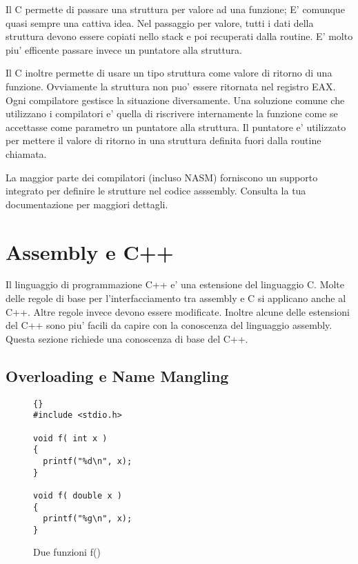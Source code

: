 Il C permette di passare una struttura per valore ad una funzione; E' comunque
quasi sempre una cattiva idea. Nel passaggio per valore, tutti i dati della
struttura devono essere copiati nello stack e poi recuperati dalla routine. E'
molto piu' efficente passare invece un puntatore alla struttura.

Il C inoltre permette di usare un tipo struttura come valore di ritorno di una
funzione. Ovviamente la struttura non puo' essere ritornata nel registro {\code EAX}.
Ogni compilatore gestisce la situazione diversamente. Una soluzione comune
che utilizzano i compilatori e' quella di riscrivere internamente la funzione
come se accettasse come parametro un puntatore alla struttura. Il puntatore
e' utilizzato per mettere il valore di ritorno in una struttura definita fuori
dalla routine chiamata.

La maggior parte dei compilatori (incluso NASM) forniscono un supporto integrato
per definire le strutture nel codice asssembly. Consulta la tua documentazione
per maggiori dettagli.



\section{Assembly e C++}

Il linguaggio di programmazione C++ e' una estensione del linguaggio C. Molte
delle regole di base per l'interfacciamento tra assembly e C si applicano
anche al C++. Altre regole invece devono essere modificate. Inoltre alcune
delle estensioni del C++ sono piu' facili da capire con la conoscenza del
linguaggio assembly. Questa sezione richiede una conoscenza di base del C++.

\subsection{Overloading e Name Mangling}
\label{subsec:mangling}
\begin{figure}
\centering
\begin{lstlisting}[frame=tlrb]{}
#include <stdio.h>

void f( int x )
{
  printf("%d\n", x);
}

void f( double x )
{
  printf("%g\n", x);
}
\end{lstlisting}
\caption{Due funzioni {\code f()} \label{fig:twof}}
\end{figure}

